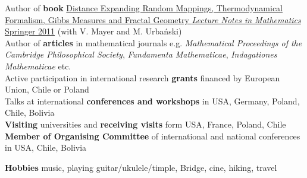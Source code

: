 \documentclass[a4paper, twoside]{scrreprt}
\begin{document}
\noindent\llap{\FA \faBook\ \ }Author of \textbf{book} \href{http://www.amazon.com/Distance-Expanding-Thermodynamical-Formalism-Mathematics/dp/3642236499/ref=sr_1_1?s=books&ie=UTF8&qid=1410309067&sr=1-1}{Distance Expanding Random Mappings, Thermodynamical Formalism, Gibbs Measures and Fractal Geometry \textit{Lecture Notes in Mathematics} Springer 2011} (with V. Mayer and M. Urbański)\\
\noindent\llap{\FA \faPencil\ \ }Author of \textbf{articles} in 
mathematical journals e.g. 
\textit{Mathematical Proceedings of the Cambridge Philosophical Society}, \textit{Fundamenta Mathematicae}, \textit{Indagationes Mathematicae} etc.\\
\noindent\llap{\FA \faGlobe\ \ }Active participation in international research \textbf{grants} financed by European Union, Chile or Poland\\
\noindent\llap{\FA \faBullhorn\ \ }Talks at international 
\textbf{conferences and workshops} in USA, Germany, Poland, 
Chile, Bolivia\\
\noindent\llap{\FA \faExchange\ \ }\textbf{Visiting} 
universities and \textbf{receiving visits} form USA, France, Poland, Chile\\
\noindent\llap{\FA \faCalendar\ \ }\textbf{Member of Organising Committee} of international and national conferences in USA, Chile, Bolivia

\noindent\makebox[\linewidth]{\rule{\textwidth}{0.4pt}}

\vspace{0.1cm}


\noindent
\begin{minipage}{0.9\textwidth}
   \noindent\llap{\FA \faMusic\ \ }\textbf{Hobbies} music, playing guitar/ukulele/timple, Bridge, cine, hiking, travel\\
\end{minipage}\hfill
\end{document}
